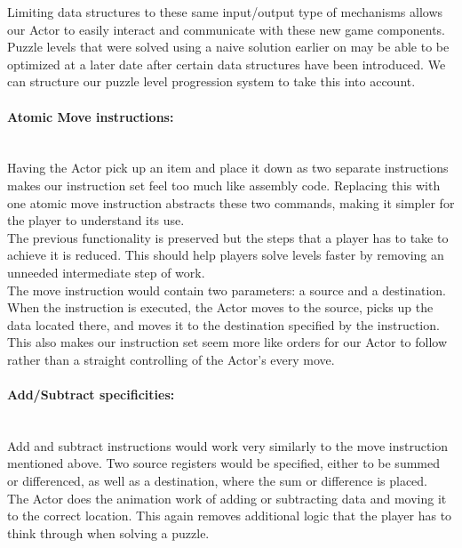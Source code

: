 Limiting data structures to these same input/output type of mechanisms allows our
Actor to easily interact and communicate with these new game components.\\

Puzzle levels that were solved using a naive solution earlier on may be able to be
optimized at a later date after certain data structures have been introduced. We can
structure our puzzle level progression system to take this into account.\\

\paragraph{Atomic Move instructions:} ~\\
Having the Actor pick up an item and place it down as two separate instructions
makes our instruction set feel too much like assembly code. Replacing this with one
atomic move instruction abstracts these two commands, making it simpler for the player
to understand its use.\\

The previous functionality is preserved but the steps that a player has to take to achieve
it is reduced. This should help players solve levels faster by removing an unneeded
intermediate step of work.\\

The move instruction would contain two parameters: a source and a destination. When the
instruction is executed, the Actor moves to the source, picks up the data located there, and moves
it to the destination specified by the instruction. This also makes our instruction set seem
more like orders for our Actor to follow rather than a straight controlling of the Actor's
every move.\\

\paragraph{Add/Subtract specificities:} ~\\
Add and subtract instructions would work very similarly to the move instruction
mentioned above. Two source registers would be specified, either to be summed or differenced,
as well as a destination, where the sum or difference is placed.\\

The Actor does the animation work of adding or subtracting data and moving it to the correct
location. This again removes additional logic that the player has to think through when
solving a puzzle.\\

